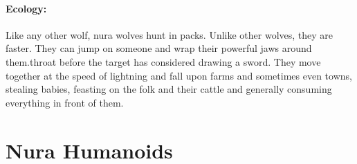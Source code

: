 \begin{multicols}{2}
\paragraph{Ecology:} Like any other wolf, nura wolves hunt in packs.  Unlike other wolves, they are faster.  They can jump on someone and wrap their powerful jaws around them.throat before the target has considered drawing a sword.  They move together at the speed of lightning and fall upon farms and sometimes even towns, stealing babies, feasting on the folk and their cattle and generally consuming everything in front of them.

\nurawolf

\end{multicols}

\section{Nura Humanoids}


